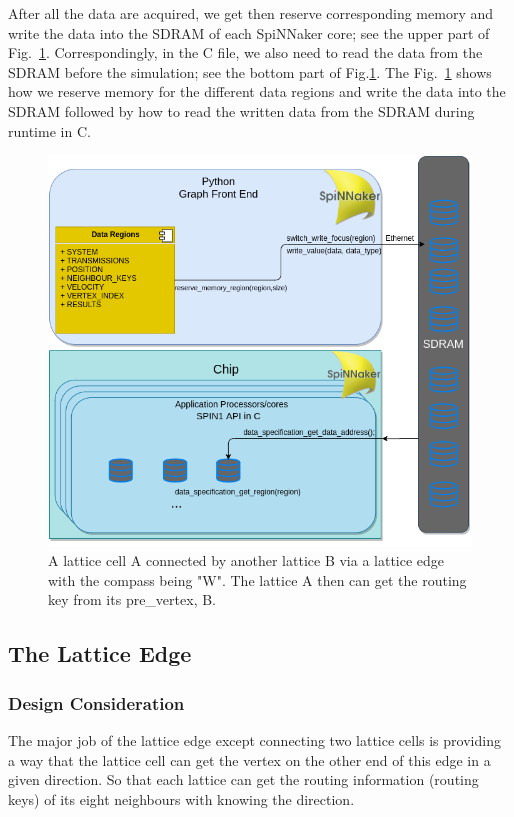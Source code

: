 After all the data are acquired, we get then reserve corresponding memory and write the data into the SDRAM of each SpiNNaker core; see the upper part of Fig.~\ref{fig:write_data}. Correspondingly, in the C file, we also need to read the data from the SDRAM before the simulation; see the bottom part of Fig.\ref{fig:write_data}. The Fig.~\ref{fig:write_data} shows how we reserve memory for the different data regions and write the data into the SDRAM followed by how to read the written data from the SDRAM during runtime in C.
\begin{figure}[tb]
   \centering
       \includegraphics[width=1\textwidth]{figures/write_data.png}
       \caption{A lattice cell A connected by another lattice B via a lattice edge with the compass being "W". The lattice A then can get the routing key from its pre\_vertex, B.}
       \label{fig:write_data}
\end{figure}



\subsection{The Lattice Edge} \label{sec:tle}
\subsubsection{Design Consideration}
The major job of the lattice edge except connecting two lattice cells is providing a way that the lattice cell can get the vertex on the other end of this edge in a given direction. So that each lattice can get the routing information (routing keys) of its eight neighbours with knowing the direction. 
